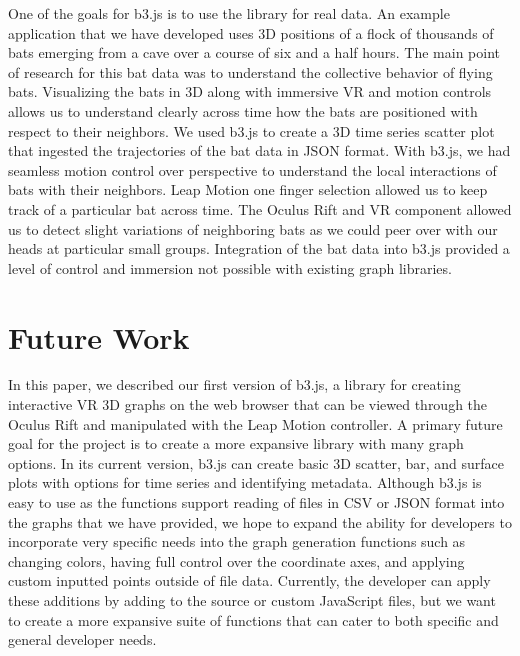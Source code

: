 \documentclass{vgtc}                          %
\begin{document}
One of the goals for b3.js is to use the library for real data. An example application that we have developed uses 3D positions of a flock of thousands of bats emerging from a cave over a course of six and a half hours. The main point of research for this bat data was to understand the collective behavior of flying bats. Visualizing the bats in 3D along with immersive VR and motion controls allows us to understand clearly across time how the bats are positioned with respect to their neighbors. We used b3.js to create a 3D time series scatter plot that ingested the trajectories of the bat data in JSON format. With b3.js, we had seamless motion control over perspective to understand the local interactions of bats with their neighbors. Leap Motion one finger selection allowed us to keep track of a particular bat across time. The Oculus Rift and VR component allowed us to detect slight variations of neighboring bats as we could peer over with our heads at particular small groups. Integration of the bat data into b3.js provided a level of control and immersion not possible with existing graph libraries.

\section{Future Work}

In this paper, we described our first version of b3.js, a library for creating interactive VR 3D graphs on the web browser that can be viewed through the Oculus Rift and manipulated with the Leap Motion controller.
A primary future goal for the project is to create a more expansive library with many graph options. In its current version, b3.js can create basic 3D scatter, bar, and surface plots with options for time series and identifying metadata. Although b3.js is easy to use as the functions support reading of files in CSV or JSON format into the graphs that we have provided, we hope to expand the ability for developers to incorporate very specific needs into the graph generation functions such as changing colors, having full control over the coordinate axes, and applying custom inputted points outside of file data. Currently, the developer can apply these additions by adding to the source or custom JavaScript files, but we want to create a more expansive suite of functions that can cater to both specific and general developer needs.






\end{document}
